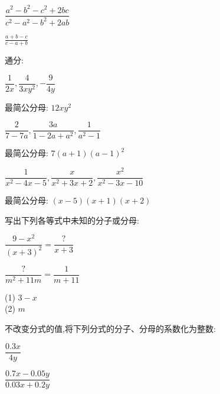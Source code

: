 \documentclass[cn,blue,12pt]{elegantbook}
\begin{document}
\begin{xiti}[resume]
\begin{multicols}{2}
\begin{xiti}
\begin{solution}
\end{solution}
        \item \(\dfrac{a^2-b^2-c^2+2bc}{c^2-a^2-b^2+2ab}\)
\begin{solution}
                \(\frac{a+b-c}{c-a+b}\)\\
\end{solution}
        \end{xiti}
    \end{multicols}
\item 通分:
    \begin{xiti}
        \setlength{\itemsep}{4.5ex}
    \item \(\dfrac{1}{2x}, \dfrac{4}{3xy^2}, -\dfrac{9}{4y}\)
\begin{solution}
            最简公分母: \(12xy^2\)\\
\end{solution}
    \item \(\dfrac{2}{7-7a}, \dfrac{3a}{1-2a+a^2}, \dfrac{1}{a^2-1}\)
\begin{solution}
            最简公分母: \(7(a+1)(a-1)^2\)\\
\end{solution}
    \item \(\dfrac{1}{x^2-4x-5}, \dfrac{x}{x^2+3x+2}, \dfrac{x^2}{x^2-3x-10}\)
\begin{solution}
            最简公分母: \((x-5)(x+1)(x+2)\)\\
\end{solution}
    \end{xiti}
\item 写出下列各等式中未知的分子或分母:
    \begin{xiti}
        \setlength{\itemsep}{4.5ex}
    \item \(\dfrac{9-x^2}{(x+3)^2}=\dfrac{?}{x+3}\)
    \item \(\dfrac{?}{m^2+11m}=\dfrac{1}{m+11}\)
    \end{xiti}
\begin{solution}
        (1) \(3-x\)\\
        (2) \(m\)
\end{solution}
\item 不改变分式的值,将下列分式的分子、分母的系数化为整数:
    \begin{multicols}{3}
        \begin{xiti}
            \setlength{\itemsep}{2.5ex}
        \item \(\dfrac{0.3x}{4y}\)
        \item \(\dfrac{0.7x-0.05y}{0.03x+0.2y}\)

\end{xiti}
\end{multicols}
\end{xiti}
\end{document}
